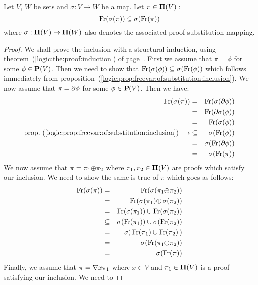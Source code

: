 \begin{prop}\label{logic:prop:FUAP:freevarproof:substitution:inclusion}
Let $V$, $W$ be sets and $\sigma:V\to W$ be a map. Let
$\pi\in\mbox{${\bf\Pi}(V)$}$\,:
    \[
    \mbox{\rm Fr}(\sigma(\pi))\subseteq\sigma(\mbox{\rm Fr}(\pi))
    \]
where $\sigma:\mbox{${\bf\Pi}(V)$}\to{\bf\Pi}(W)$ also denotes the associated proof
substitution mapping.
\end{prop}
\begin{proof}
We shall prove the inclusion with a structural induction, using
theorem~(\ref{logic:the:proof:induction}) of
page~\pageref{logic:the:proof:induction}. First we assume that
$\pi=\phi$ for some $\phi\in\mbox{${\bf P}(V)$}$. Then we need to show that
$\mbox{\rm Fr}(\sigma(\phi))\subseteq\sigma(\mbox{\rm Fr}(\phi))$ which follows
immediately from
proposition~(\ref{logic:prop:freevar:of:substitution:inclusion}). We
now assume that $\pi=\mbox{$\partial$}\phi$ for some $\phi\in\mbox{${\bf P}(V)$}$. Then we have:
    \begin{eqnarray*}
    \free(\sigma(\pi))&=&\free(\sigma(\axi\phi))\\
    &=&\free(\axi\sigma(\phi))\\
    &=&\free(\sigma(\phi))\\
    \mbox{prop.~(\ref{logic:prop:freevar:of:substitution:inclusion})}\ \rightarrow
    &\subseteq&\sigma(\free(\phi))\\
    &=&\sigma(\free(\axi\phi))\\
    &=&\sigma(\free(\pi))\\
    \end{eqnarray*}
We now assume that $\pi=\pi_{1}\mbox{$\oplus$}\pi_{2}$ where
$\pi_{1},\pi_{2}\in\mbox{${\bf\Pi}(V)$}$ are proofs which satisfy our inclusion. We
need to show the same is true of $\pi$ which goes as follows:
    \begin{eqnarray*}
    \mbox{\rm Fr}(\sigma(\pi))&=&\mbox{\rm Fr}(\sigma(\pi_{1}\mbox{$\oplus$}\pi_{2}))\\
    &=&\mbox{\rm Fr}(\sigma(\pi_{1})\mbox{$\oplus$}\,\sigma(\pi_{2}))\\
    &=&\mbox{\rm Fr}(\sigma(\pi_{1}))\cup\mbox{\rm Fr}(\sigma(\pi_{2}))\\
    &\subseteq&\sigma(\mbox{\rm Fr}(\pi_{1}))\cup\sigma(\mbox{\rm Fr}(\pi_{2}))\\
    &=&\sigma(\,\mbox{\rm Fr}(\pi_{1})\cup\mbox{\rm Fr}(\pi_{2})\,)\\
    &=&\sigma(\mbox{\rm Fr}(\pi_{1}\mbox{$\oplus$}\pi_{2}))\\
    &=&\sigma(\mbox{\rm Fr}(\pi))\\
    \end{eqnarray*}
Finally, we assume that $\pi=\mbox{$\nabla$} x\pi_{1}$ where $x\in V$ and
$\pi_{1}\in\mbox{${\bf\Pi}(V)$}$ is a proof satisfying our inclusion. We need to

\end{proof}
